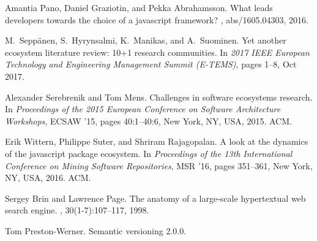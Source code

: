\documentclass[10pt,conference]{IEEEtran}
\begin{document}
\begin{thebibliography}{00}
    Amantia Pano, Daniel Graziotin, and Pekka Abrahamsson.
    \newblock What leads developers towards the choice of a javascript framework?
    , abs/1605.04303, 2016.

    M.~{Seppänen}, S.~{Hyrynsalmi}, K.~{Manikas}, and A.~{Suominen}.
    \newblock Yet another ecosystem literature review: 10+1 research communities.
    \newblock In {\em 2017 IEEE European Technology and Engineering Management
    Summit (E-TEMS)}, pages 1--8, Oct 2017.

    Alexander Serebrenik and Tom Mens.
    \newblock Challenges in software ecosystems research.
    \newblock In {\em Proceedings of the 2015 European Conference on Software
    Architecture Workshops}, ECSAW '15, pages 40:1--40:6, New York, NY, USA,
    2015. ACM.

    Erik Wittern, Philippe Suter, and Shriram Rajagopalan.
    \newblock A look at the dynamics of the javascript package ecosystem.
    \newblock In {\em Proceedings of the 13th International Conference on Mining
    Software Repositories}, MSR '16, pages 351--361, New York, NY, USA, 2016.
    ACM.

    Sergey Brin and Lawrence Page.
    \newblock The anatomy of a large-scale hypertextual web search engine.
    , 30(1-7):107--117, 1998.

    Tom Preston-Werner.
    \newblock Semantic versioning 2.0.0.


\end{thebibliography}

\vspace{12pt}
\end{document}
